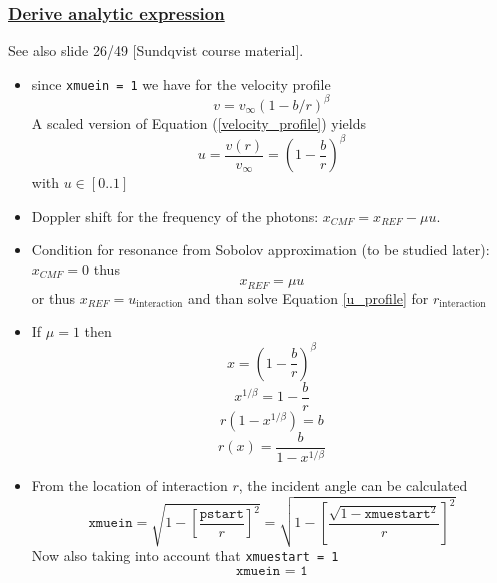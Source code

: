 \documentclass[../main/main.tex]{subfiles}
\begin{document}
\subsubsection{\underline{Derive analytic expression}} See also slide  26/49 [Sundqvist course material]. 
\begin{itemize}
\item since \texttt{xmuein = 1} we have for the velocity profile 
\begin{equation}
v = v_{\infty}(1-b/r)^{\beta}
\label{velocity_profile}
\end{equation}
A scaled version of Equation (\ref{velocity_profile}) yields 
\begin{equation}
u = \frac{v(r)}{v_{\infty}} = \left(1 - \frac{b}{r} \right)^{\beta} 
\label{u_profile}
\end{equation}
with $u \in [0..1]$

\item Doppler shift for the frequency of the photons: $x_{CMF} = x_{REF} - \mu u$.
\item Condition for resonance from Sobolov approximation (to be studied later): $\boxed{x_{CMF}= 0}$ thus 
\begin{equation}
x_{REF} = \mu u
\label{analytic_profile}
\end{equation}
or thus $x_{REF} = \boxed{u_{\text{interaction}}}$ and than solve Equation \ref{u_profile} for $r_{\text{interaction}}$


\item If $\mu = 1$ then 
\begin{equation}
x = \left(1 - \frac{b}{r} \right)^{\beta}
\end{equation}
\begin{equation*}
x^{1/\beta} = 1 - \frac{b}{r}
\end{equation*}
\begin{equation*}
r(1-x^{1/\beta}) = b
\end{equation*}
\begin{equation}
\boxed{r(x) = \frac{b}{1-x^{1/\beta}}}
\end{equation}

\item From the location of interaction $r$, the incident angle can be calculated
\begin{equation}
\texttt{xmuein} = \sqrt{1-\left[\frac{\texttt{pstart}}{r}\right]^2} = \sqrt{1 - \left[ \frac{\sqrt{1-\texttt{xmuestart}^2}}{r} \right]^2}
\end{equation}
Now also taking into account that \texttt{xmuestart = 1} 
\begin{equation}
\texttt{xmuein = 1}
\end{equation}


\end{itemize}
\end{document}
